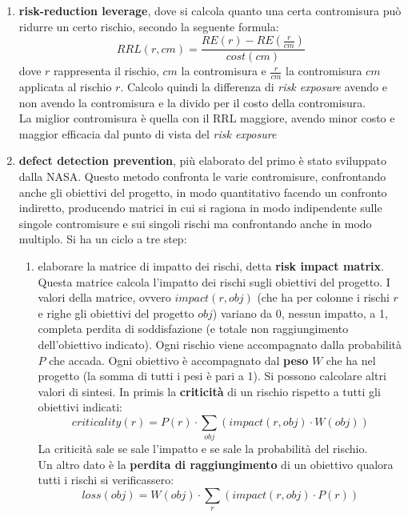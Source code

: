\documentclass[a4paper,12pt, oneside]{book}
\begin{document}
\begin{enumerate}
  \item \textbf{risk-reduction leverage}, dove si calcola quanto una certa
  contromisura può ridurre un certo rischio, secondo la seguente formula:
  \[RRL(r, cm)=\frac{RE(r)-RE\left(\frac{r}{cm}\right)}{cost(cm)}\]
      dove $r$ rappresenta il rischio, $cm$ la contromisura e $\frac{r}{cm}$ la
      contromisura $cm$ applicata al rischio $r$. Calcolo quindi la differenza
      di \textit{risk exposure} avendo e non avendo la contromisura e la divido
      per il costo della contromisura.\\
      La miglior contromisura è quella con il RRL maggiore, avendo minor costo e
      maggior efficacia dal punto di vista del \textit{risk exposure}
  \item \textbf{defect detection prevention}, più elaborato del primo è stato
  sviluppato dalla NASA. Questo metodo confronta le varie contromisure,
  confrontando anche gli obiettivi del progetto, in modo quantitativo facendo un
  confronto indiretto, producendo matrici in cui si ragiona in modo indipendente
  sulle singole contromisure e sui singoli rischi ma confrontando anche in modo
  multiplo.
  \newpage
  Si ha un ciclo a tre step:
  \begin{enumerate}
    \item elaborare la matrice di impatto dei rischi, detta \textbf{risk impact
      matrix}. Questa matrice calcola l'impatto dei rischi sugli obiettivi del
    progetto. I valori della matrice, ovvero $impact(r, obj)$ (che ha per
    colonne i rischi $r$ e righe gli obiettivi del progetto $obj$) variano da 0,
    nessun impatto, a 1, completa perdita 
    di soddisfazione (e totale non raggiungimento dell'obiettivo indicato). Ogni
    rischio viene accompagnato dalla probabilità $P$ che 
    accada. Ogni obiettivo è accompagnato dal \textbf{peso} $W$ che ha nel
    progetto (la somma di tutti i pesi è pari a 1). Si possono calcolare altri
    valori di sintesi. In primis la \textbf{criticità} di un rischio rispetto a
    tutti gli obiettivi indicati:
    \[criticality(r)=P(r)\cdot\sum_{obj}(impact(r, obj)\cdot W(obj))\]
    La criticità sale se sale l'impatto e se sale la probabilità del rischio.\\
    Un altro dato è la \textbf{perdita di raggiungimento} di un obiettivo
    qualora tutti i rischi si verificassero:
    \[loss(obj)=W(obj)\cdot\sum_{r}(impact(r, obj)\cdot P(r))\]
    

\end{enumerate}
\end{enumerate}
\end{document}

